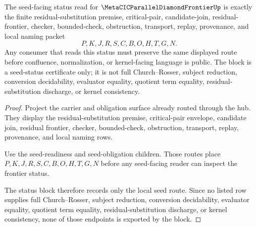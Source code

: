 \begin{theorem}
\label{thm:metacic-parallel-diamond-frontier-seed-status-closure-block}
The seed-facing status read for $\MetaCICParallelDiamondFrontierUp$ is exactly the finite residual-substitution premise, critical-pair, candidate-join, residual-frontier, checker, bounded-check, obstruction, transport, replay, provenance, and local naming packet
$$
P,K,J,R,S,C,B,O,H,T,G,N .
$$
Any consumer that reads this status must preserve the same displayed route before confluence, normalization, or kernel-facing language is public. The block is a seed-status certificate only; it is not full Church--Rosser, subject reduction, conversion decidability, evaluator equality, quotient term equality, residual-substitution discharge, or kernel consistency.
\end{theorem}
\begin{proof}
Project the carrier and obligation surface already routed through the hub. They display the residual-substitution premise, critical-pair envelope, candidate join, residual frontier, checker, bounded-check, obstruction, transport, replay, provenance, and local naming rows.

Use the seed-readiness and seed-obligation children. Those routes place $P,K,J,R,S,C,B,O,H,T,G,N$ before any seed-facing reader can inspect the frontier status.

The status block therefore records only the local seed route. Since no listed row supplies full Church--Rosser, subject reduction, conversion decidability, evaluator equality, quotient term equality, residual-substitution discharge, or kernel consistency, none of those endpoints is exported by the block.
\end{proof}


